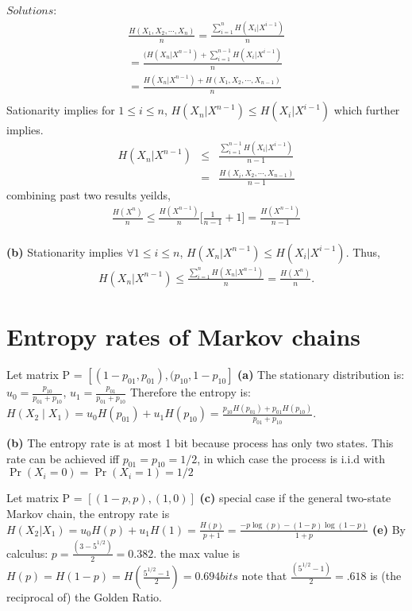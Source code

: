 \documentclass[10pt]{article}
\begin{document}
\begin{tiny}
\begin{multicols}{3}
$Solutions$:
\begin{eqnarray*}
\frac{H(X_1,X_2,\cdots,X_n)}{n} = \frac{\sum_{i=1}^n H(X_i | X^{i-1})}{n} \\ 
= \frac{(H(X_n | X^{n-1}) + \sum_{i=1}^{n-1} H(X_i |X^{i-1}) } {n} \\ 
= \frac{H(X_n | X^{n-1}) + H(X_1,X_2,\cdots,X_{n-1}) } {n} \\
\end{eqnarray*}
Sationarity implies for $1\le i \le n$, $H(X_n | X^{n-1}) \le H(X_i | X^{i-1}) $
which further implies.
\begin{eqnarray*}
H(X_n | X^{n-1}) &\le& \frac{ \sum_{i=1}^{n-1} H(X_i | X^{i-1})} {n-1} \\
&=& \frac{ H(X_i,X_2,\cdots,X_{n-1})} {n-1}
\end{eqnarray*}
combining past two results yeilds, 
\begin{eqnarray*}
\frac{H(X^n)}{n} \leq \frac{H(X^{n-1})}{n} \bigg[ \frac{ 1 } {n-1}  + 1 \bigg]
= \frac{H(X^{n-1})}{n-1}
\end{eqnarray*}
\\
\textbf{(b)} Stationarity implies $\forall 1 \leq i \leq n$, $H(X_n |
X^{n-1} ) \leq H(X_i | X^{i-1})$. Thus,
\begin{eqnarray*}
H(X_n | X^{n-1}) \leq \frac{\sum_{i=1}^n H(X_n | X^{n-1}) } {n}
= \frac{H(X^n)}{n}.
\end{eqnarray*}


\section*{Entropy rates of Markov chains}

Let matrix P = $[ (1-p_{01}, p_{01}), (p_{10}, 1-p_{10}]$ 
\textbf{(a)} The stationary distribution is: $u_0=\frac{p_{10}}{p_{01}+p_{10}}$, $u_1=\frac{p_{01}}{p_{01}+p_{10}}$
Therefore the entropy is: \( H(X_2 \mid X_1) = u_0H(p_{01})+u_1H(p_{10}) = \frac{p_{10}H(p_{01})+ p_{01}H(p_{10})}{p_{01}+p_{10}}. \)

\textbf{(b)} The entropy rate is at most 1 bit because process has only two states. This rate can be achieved iff \(p_{01}=p_{10}=1/2 \), in which case the process is i.i.d with \( \Pr(X_i = 0) =\Pr(X_i=1) = 1/2 \)

Let matrix P = $[ (1-p, p), (1, 0)]$ 
\textbf{(c)} special case if the general two-state Markov chain, the entropy rate is \( H(X_2 | X_1)=u_0H(p)+u_1H(1)=\frac{H(p)}{p+1} = \frac{-p\log(p)-(1-p)\log(1-p)}{1+p} \)
\textbf{(e)} By calculus: \( p=\frac{(3-5^{1/2})}{2}=0.382.\) the max value is \(H(p)=H(1-p)=H(\frac{5^{1/2}-1}{2}) = 0.694bits\)
note that \( \frac{(5^{1/2}-1)}{2} =.618\) is (the reciprocal of) the Golden Ratio.


\end{multicols}
\end{tiny}
\end{document}
